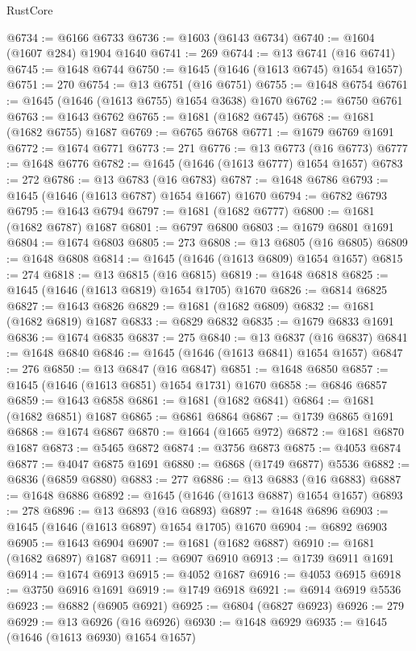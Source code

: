 \begin{lexlean}{RustCore}
\begin{coremodule}
@6734 := @6166 @6733
@6736 := @1603 (@6143 @6734)
@6740 := @1604 (@1607 @284) @1904 @1640
@6741 := 269
@6744 := @13 @6741 (@16 @6741)
@6745 := @1648 @6744
@6750 := @1645 (@1646 (@1613 @6745) @1654 @1657)
@6751 := 270
@6754 := @13 @6751 (@16 @6751)
@6755 := @1648 @6754
@6761 := @1645 (@1646 (@1613 @6755) @1654 @3638) @1670
@6762 := @6750 @6761
@6763 := @1643 @6762
@6765 := @1681 (@1682 @6745)
@6768 := @1681 (@1682 @6755) @1687
@6769 := @6765 @6768
@6771 := @1679 @6769 @1691
@6772 := @1674 @6771
@6773 := 271
@6776 := @13 @6773 (@16 @6773)
@6777 := @1648 @6776
@6782 := @1645 (@1646 (@1613 @6777) @1654 @1657)
@6783 := 272
@6786 := @13 @6783 (@16 @6783)
@6787 := @1648 @6786
@6793 := @1645 (@1646 (@1613 @6787) @1654 @1667) @1670
@6794 := @6782 @6793
@6795 := @1643 @6794
@6797 := @1681 (@1682 @6777)
@6800 := @1681 (@1682 @6787) @1687
@6801 := @6797 @6800
@6803 := @1679 @6801 @1691
@6804 := @1674 @6803
@6805 := 273
@6808 := @13 @6805 (@16 @6805)
@6809 := @1648 @6808
@6814 := @1645 (@1646 (@1613 @6809) @1654 @1657)
@6815 := 274
@6818 := @13 @6815 (@16 @6815)
@6819 := @1648 @6818
@6825 := @1645 (@1646 (@1613 @6819) @1654 @1705) @1670
@6826 := @6814 @6825
@6827 := @1643 @6826
@6829 := @1681 (@1682 @6809)
@6832 := @1681 (@1682 @6819) @1687
@6833 := @6829 @6832
@6835 := @1679 @6833 @1691
@6836 := @1674 @6835
@6837 := 275
@6840 := @13 @6837 (@16 @6837)
@6841 := @1648 @6840
@6846 := @1645 (@1646 (@1613 @6841) @1654 @1657)
@6847 := 276
@6850 := @13 @6847 (@16 @6847)
@6851 := @1648 @6850
@6857 := @1645 (@1646 (@1613 @6851) @1654 @1731) @1670
@6858 := @6846 @6857
@6859 := @1643 @6858
@6861 := @1681 (@1682 @6841)
@6864 := @1681 (@1682 @6851) @1687
@6865 := @6861 @6864
@6867 := @1739 @6865 @1691
@6868 := @1674 @6867
@6870 := @1664 (@1665 @972)
@6872 := @1681 @6870 @1687
@6873 := @5465 @6872
@6874 := @3756 @6873
@6875 := @4053 @6874
@6877 := @4047 @6875 @1691
@6880 := @6868 (@1749 @6877) @5536
@6882 := @6836 (@6859 @6880)
@6883 := 277
@6886 := @13 @6883 (@16 @6883)
@6887 := @1648 @6886
@6892 := @1645 (@1646 (@1613 @6887) @1654 @1657)
@6893 := 278
@6896 := @13 @6893 (@16 @6893)
@6897 := @1648 @6896
@6903 := @1645 (@1646 (@1613 @6897) @1654 @1705) @1670
@6904 := @6892 @6903
@6905 := @1643 @6904
@6907 := @1681 (@1682 @6887)
@6910 := @1681 (@1682 @6897) @1687
@6911 := @6907 @6910
@6913 := @1739 @6911 @1691
@6914 := @1674 @6913
@6915 := @4052 @1687
@6916 := @4053 @6915
@6918 := @3750 @6916 @1691
@6919 := @1749 @6918
@6921 := @6914 @6919 @5536
@6923 := @6882 (@6905 @6921)
@6925 := @6804 (@6827 @6923)
@6926 := 279
@6929 := @13 @6926 (@16 @6926)
@6930 := @1648 @6929
@6935 := @1645 (@1646 (@1613 @6930) @1654 @1657)

\end{coremodule}
\end{lexlean}
